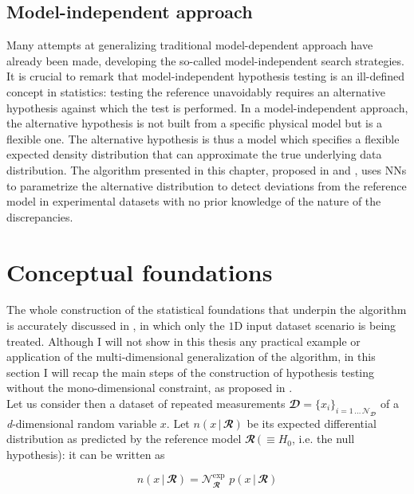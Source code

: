 \subsection{Model-independent approach}

Many attempts at generalizing traditional model-dependent approach have already been made, developing the so-called
model-independent search strategies. It is crucial to remark that model-independent hypothesis testing is an ill-defined
concept in statistics: testing the reference unavoidably requires an alternative hypothesis against which the test is
performed. In a model-independent approach, the alternative hypothesis is not built from a specific physical model but
is a flexible one. The alternative hypothesis is thus a model which specifies a flexible expected density distribution
that can approximate the true underlying data distribution. The algorithm presented in this chapter, proposed in
\cite{zanetti} and \cite{wulzer}, uses NNs to parametrize the alternative distribution to detect deviations from the
reference model in experimental datasets with no prior knowledge of the nature of the discrepancies. 


\section{Conceptual foundations}
\label{sec:foundations}

The whole construction of the statistical foundations that underpin the algorithm is accurately discussed in
\cite{wulzer}, in which only the $1\text{D}$ input dataset scenario is being treated. Although I will not show in this
thesis any practical example or application of the multi-dimensional generalization of the algorithm, in this section I
will recap the main steps of the construction of hypothesis testing without the mono-dimensional constraint, as proposed
in \cite{zanetti}.\\

Let us consider then a dataset of repeated measurements
$\mathbfcal{D}=\{x_i\}_{i=1\,\ldots\,\mathcal{N}_{\mathbfcal{D}}}$ of a \textit{d}-dimensional random variable $x$. Let
$n(x\,|\,\mathbfcal{R})$ be its expected differential distribution as predicted by the reference model
$\mathbfcal{R}\,(\,\equiv H_0$, i.e. the null hypothesis): it can be written as 

\begin{equation}
    n(x\,|\,\mathbfcal{R}) = \mathcal{N}_{\mathbfcal{R}}^{\text{exp}}\,\,p(x\,|\,\mathbfcal{R})
\end{equation}

